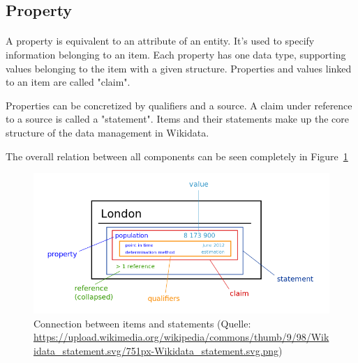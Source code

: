 \documentclass[12pt]{article}
\begin{document}
\subsection{Property}
\paragraph{}
A property is equivalent to an attribute of an entity. It's used to specify information belonging to an item. Each property has one data type, supporting values belonging to the item with a given structure. Properties and values linked to an item are called "claim". 

Properties can be concretized by qualifiers and a source. A claim under reference to a source is called a "statement". Items and their statements make up the core structure of the data management in Wikidata.



The overall relation between all components can be seen completely in Figure~\ref{pic3} 

\begin{figure}
\includegraphics[width=\textwidth]{Pic3}
\caption{Connection between items and statements (Quelle: \url{https://upload.wikimedia.org/wikipedia/commons/thumb/9/98/Wikidata_statement.svg/751px-Wikidata_statement.svg.png})}
\label{pic3}
\end{figure}
\end{document}
